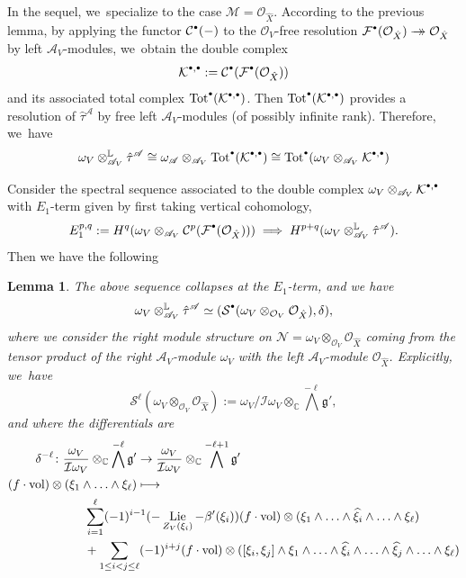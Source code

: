 \documentclass[JEP,XML,SOM,Unicode,published]{cedram}
\let\mathds\mathbb
\newcommand{\onto}{\mathchoice{\to\hspace*{-5mm}\to}{\to\hspace*{-2.85mm}\to}{\to\hspace*{-3mm}\to}{\to\hspace*{-3mm}\to}}
\newcommand\mto{\mathchoice{\longmapsto}{\mapsto}{\mapsto}{\mapsto}}
\newcommand{\sbullet}{{\scriptscriptstyle\bullet}}
\newcommand{\csbullet}{{\raisebox{1pt}{$\sbullet$}}}
\newtheorem{lem}[thm]{Lemma}
\newcommand{\dC}{{\mathds C}}\let\C\dC
\newcommand{\dL}{{\mathbb L}}
\newcommand{\cA}{\mathscr{A}}
\newcommand{\cC}{\mathcal{C}}
\newcommand{\cF}{\mathcal{F}}
\newcommand{\cI}{\mathcal{I}}
\newcommand{\cK}{\mathcal{K}}
\newcommand{\cM}{\mathcal{M}}
\newcommand{\cN}{\mathcal{N}}
\newcommand{\cO}{\mathcal{O}}\let\O\cO
\newcommand{\cS}{\mathcal{S}}
\newcommand{\frg}{\mathfrak{g}}
\DeclareMathOperator{\Lie}{\textup{Lie}}
\DeclareMathOperator{\vol}{\textup{vol}}
\begin{document}
In the sequel, we~specialize to the case $\cM=\cO_{\hat{X}}$.
According to the previous lemma, by applying the functor
$\cC^{\csbullet}(-)$ to the $\cO_V$-free resolution $\cF^{\csbullet}(\cO_{\hat{X}}) \onto \cO_{\hat{X}}$ by left $\cA_V$\nobreakdash-mod\-ules, we~obtain the double complex
\[
\cK^{\csbullet,\csbullet} :=
\cC^{\csbullet}(\cF^{\csbullet}(\cO_{\hat{X}}))
\]
and its associated total complex $\textup{Tot}^{\csbullet}(\cK^{\csbullet,\csbullet})$. Then
$\textup{Tot}^{\csbullet}(\cK^{\csbullet,\csbullet})$ provides a resolution of $\hat\tau^\cA$ by free left $\cA_V$\nobreakdash-mod\-ules (of possibly infinite rank). Therefore, we~have
\[
\omega_V\otimes^\dL_{\cA_V}\hat\tau^\cA\cong
\omega_\cA \otimes_{\cA_V} \textup{Tot}^{\csbullet}(\cK^{\csbullet,\csbullet})
\cong
\textup{Tot}^{\csbullet}(\omega_V \otimes_{\cA_V}\cK^{\csbullet,\csbullet})
\]

Consider the spectral sequence associated to the double complex $\omega_V \otimes_{\cA_V}\cK^{\csbullet,\csbullet}$
with $E_1$-term given by first taking vertical cohomology, \ie
\[
E_1^{p,q}:=H^q(\omega_V\otimes_{\cA_V}
\cC^p(\cF^{\csbullet}(\cO_{\hat{X}}))) \implies
H^{p+q}(\omega_V\otimes^\dL_{\cA_V}\hat\tau^\cA).
\]
Then we have the following

\begin{lem}
The above sequence collapses at the $E_1$-term, and we have
\[
\omega_V\otimes^\dL_{\cA_V}\hat\tau^\cA
\simeq (\cS^{\csbullet}(\omega_V\otimes_{\cO_V}\cO_{\hat{X}}), \delta),
\]
where we consider the right module structure on $\cN=\omega_V\otimes_{\cO_V}\cO_{\hat{X}}$ coming from the tensor product of the right $\cA_V$\nobreakdash-mod\-ule $\omega_V$ with the left $\cA_V$\nobreakdash-mod\-ule $\cO_{\hat{X}}$.
Explicitly, we~have
\[
\cS^\ell(\omega_V\otimes_{\cO_V}\cO_{\hat{X}}):=
\omega_V/\cI\omega_V\otimes_\dC \bigwedge^{-\ell}\frg',
\]
and where the differentials are
\begin{align*}
\delta^{-\ell} \colon
\frac{\omega_V}{\cI\omega_V}\otimes_\dC \bigwedge^{-\ell}\frg'
&\to
\frac{\omega_V}{\cI\omega_V}\otimes_\dC \bigwedge^{-\ell+1}\frg'
\\
(f\cdot\vol) \otimes (\xi_1 \wedge \ldots \wedge \xi_\ell) &\mto\\
&\hspace*{-1.5cm}
\sum\limits_{i=1}^\ell (-1)^{i-1}
(-\Lie_{Z_V(\xi_i)}-\beta'(\xi_i))(f\cdot\vol) \otimes (\xi_1 \wedge \ldots \wedge \widehat{\xi}_i \wedge\ldots \wedge \xi_\ell)\\
&\hspace*{-1.5cm}+ \sum\limits_{1 \leq i < j \leq \ell} (-1)^{i+j} (f\cdot\vol)\otimes ([\xi_i,\xi_j] \wedge \xi_1 \wedge \ldots \wedge \widehat{\xi}_i \wedge \ldots \wedge \widehat{\xi}_j \wedge \ldots \wedge \xi_\ell)
\end{align*}
\end{lem}
\end{document}
